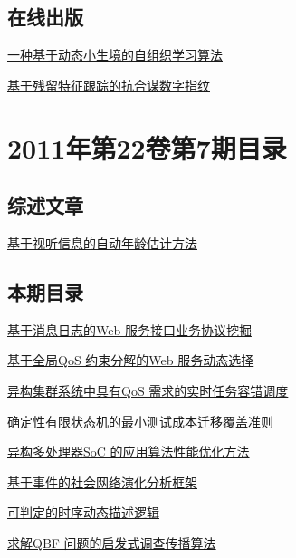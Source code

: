 \documentclass[a4paper]{article}
\begin{document}
\subsection{在线出版}
\href{http://www.jos.org.cn/ch/reader/download_pdf.aspx?file_no=3830&year_id=2011&quarter_id=8&falg=1}{一种基于动态小生境的自组织学习算法}

\href{http://www.jos.org.cn/ch/reader/download_pdf.aspx?file_no=3822&year_id=2011&quarter_id=8&falg=1}{基于残留特征跟踪的抗合谋数字指纹}


\section{\textbf{2011年第22卷第7期目录}}
\subsection{综述文章}
\href{http://www.jos.org.cn/ch/reader/download_pdf.aspx?file_no=4012&year_id=2011&quarter_id=7&falg=1}{基于视听信息的自动年龄估计方法}

\subsection{本期目录}
\href{http://www.jos.org.cn/ch/reader/download_pdf.aspx?file_no=3820&year_id=2011&quarter_id=7&falg=1}{基于消息日志的Web 服务接口业务协议挖掘}

\href{http://www.jos.org.cn/ch/reader/download_pdf.aspx?file_no=3842&year_id=2011&quarter_id=7&falg=1}{基于全局QoS 约束分解的Web 服务动态选择}

\href{http://www.jos.org.cn/ch/reader/download_pdf.aspx?file_no=3833&year_id=2011&quarter_id=7&falg=1}{异构集群系统中具有QoS 需求的实时任务容错调度}

\href{http://www.jos.org.cn/ch/reader/download_pdf.aspx?file_no=3872&year_id=2011&quarter_id=7&falg=1}{确定性有限状态机的最小测试成本迁移覆盖准则}

\href{http://www.jos.org.cn/ch/reader/download_pdf.aspx?file_no=3847&year_id=2011&quarter_id=7&falg=1}{异构多处理器SoC 的应用算法性能优化方法}

\href{http://www.jos.org.cn/ch/reader/download_pdf.aspx?file_no=3841&year_id=2011&quarter_id=7&falg=1}{基于事件的社会网络演化分析框架}

\href{http://www.jos.org.cn/ch/reader/download_pdf.aspx?file_no=3869&year_id=2011&quarter_id=7&falg=1}{可判定的时序动态描述逻辑}

\href{http://www.jos.org.cn/ch/reader/download_pdf.aspx?file_no=3859&year_id=2011&quarter_id=7&falg=1}{求解QBF 问题的启发式调查传播算法}
\end{document}

